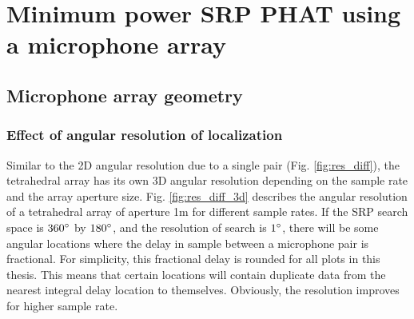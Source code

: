 \section{Minimum power SRP PHAT using a microphone array}
\subsection{Microphone array geometry}

\subsubsection{Effect of angular resolution of localization}
Similar to the 2D angular resolution due to a single pair (Fig. \ref{fig:res_diff}), the tetrahedral array has its own 3D  angular resolution depending on the sample rate and the array aperture size. Fig. \ref{fig:res_diff_3d} describes the angular resolution of a tetrahedral array of aperture 1m for different sample rates. If the SRP search space is $360\degree$ by $180\degree$, and the resolution of search is $1\degree$, there will be some angular locations where the delay in sample between a microphone pair is fractional. For simplicity, this fractional delay is rounded for all plots in this thesis. This means that certain locations will contain duplicate data from the nearest integral delay location to themselves. Obviously, the resolution improves for higher sample rate.
